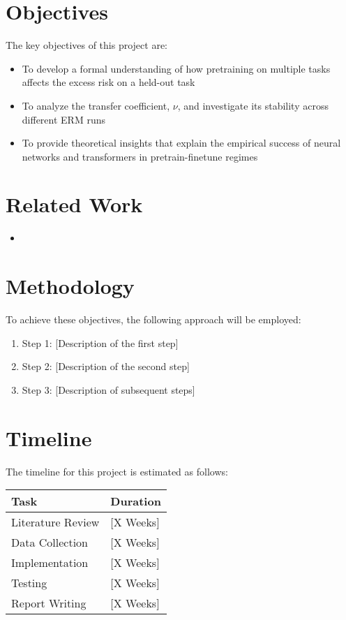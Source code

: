 \documentclass[a4paper, 12pt]{article}
\begin{document}
\section*{Objectives}
The key objectives of this project are:
\begin{itemize}
    \item To develop a formal understanding of how pretraining on multiple tasks affects the excess risk on a held-out task
    \item To analyze the transfer coefficient, $\nu$, and investigate its stability across different ERM runs
    \item To provide theoretical insights that explain the empirical success of neural networks and transformers in pretrain-finetune regimes
\end{itemize}

\section*{Related Work}
\begin{itemize}
    \item 
\end{itemize}

\section*{Methodology}
To achieve these objectives, the following approach will be employed:
\begin{enumerate}
    \item Step 1: [Description of the first step]
    \item Step 2: [Description of the second step]
    \item Step 3: [Description of subsequent steps]
\end{enumerate}

\section*{Timeline}
The timeline for this project is estimated as follows:
\begin{tabular}{|l|l|}
\hline
\textbf{Task} & \textbf{Duration} \\
\hline
Literature Review & [X Weeks] \\
Data Collection & [X Weeks] \\
Implementation & [X Weeks] \\
Testing & [X Weeks] \\
Report Writing & [X Weeks] \\
\hline
\end{tabular}
\end{document}
